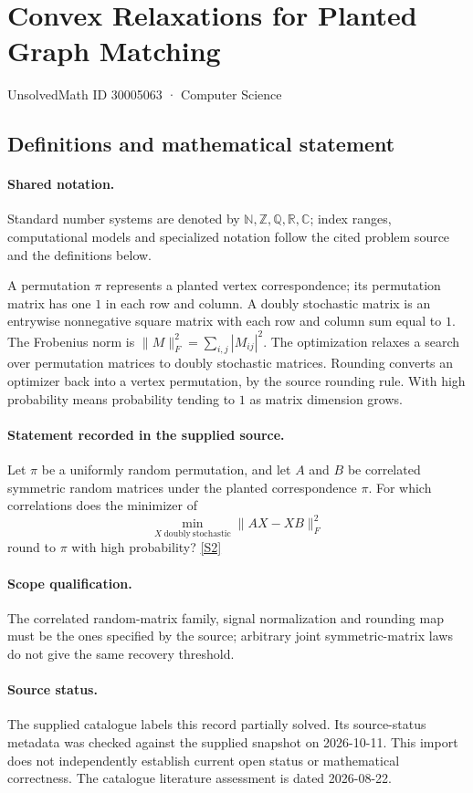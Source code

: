 \documentclass[11pt]{article}
\newcommand{\sref}[2]{\hyperlink{source:#1:#2}{[S#2]}}
\begin{document}
\setcounter{section}{30005062}
\section{Convex Relaxations for Planted Graph Matching}\label{30005063}
{\small\sffamily UnsolvedMath ID 30005063 · Computer Science}
\subsection{Definitions and mathematical statement}

\paragraph{Shared notation.}Standard number systems are denoted by $\mathbb N,\mathbb Z,\mathbb Q,\mathbb R,\mathbb C$; index ranges, computational models and specialized notation follow the cited problem source and the definitions below.


A permutation $\pi$ represents a planted vertex correspondence; its permutation matrix has one $1$ in each row and column. A doubly stochastic matrix is an entrywise nonnegative square matrix with each row and column sum equal to $1$. The Frobenius norm is $\lVert M\rVert_F^2=\sum_{i,j}|M_{ij}|^2$. The optimization relaxes a search over permutation matrices to doubly stochastic matrices. Rounding converts an optimizer back into a vertex permutation, by the source rounding rule. With high probability means probability tending to $1$ as matrix dimension grows.
\paragraph{Statement recorded in the supplied source.}
Let $\pi$ be a uniformly random permutation, and let $A$ and $B$ be correlated symmetric random matrices under the planted correspondence $\pi$. For which correlations does the minimizer of
$$
\min_{X\ \mathrm{doubly\ stochastic}}\|AX-XB\|_F^2
$$
round to $\pi$ with high probability? \sref{30005063}{2}
\paragraph{Scope qualification.}
The correlated random-matrix family, signal normalization and rounding map must be the ones specified by the source; arbitrary joint symmetric-matrix laws do not give the same recovery threshold.
\paragraph{Source status.}
The supplied catalogue labels this record partially solved. Its source-status metadata was checked against the supplied snapshot on 2026-10-11. This import does not independently establish current open status or mathematical correctness. The catalogue literature assessment is dated 2026-08-22.
\end{document}

